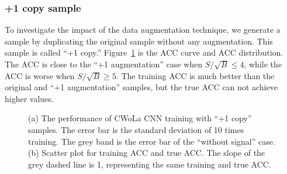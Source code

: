\documentclass[12pt]{article}
\begin{document}
        \subsubsection{+1 copy sample}%
        \label{subs:_1_copy_sample}
            To investigate the impact of the data augmentation technique, we generate a sample by duplicating the original sample without any augmentation. This sample is called ``+1 copy.''
            Figure~\ref{fig:cwola_cnn_training_performance_copy_1} is the ACC curve and ACC distribution. The ACC is close to the ``+1 augmentation'' case when $S / \sqrt{B} \le 4$, while the ACC is worse when $S / \sqrt{B} \ge 5$. The training ACC is much better than the original and ``+1 augmentation'' samples, but the true ACC can not achieve higher values.
            \begin{figure}[htpb]
                \centering
                \caption{(a) The performance of CWoLa CNN training with ``+1 copy'' samples. The error bar is the standard deviation of 10 times training. The grey band is the error bar of the ``without signal'' case. (b) Scatter plot for training ACC and true ACC. The slope of the grey dashed line is 1, representing the same training and true ACC.}
                \label{fig:cwola_cnn_training_performance_copy_1}
            \end{figure}
\end{document}
